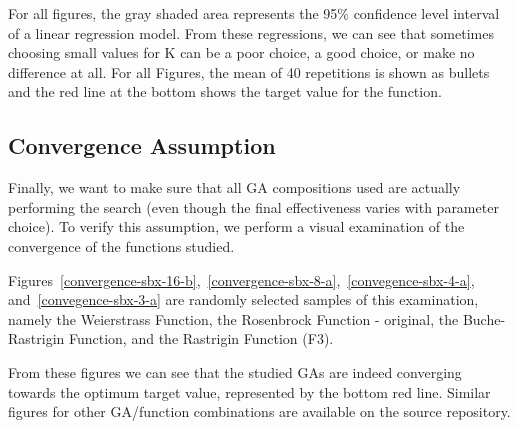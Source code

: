 For all figures, the gray shaded area represents the 95\% confidence
level interval of a linear regression model. From these regressions,
we can see that sometimes choosing small values for K can be a poor
choice, a good choice, or make no difference at all. For all Figures,
the mean of 40 repetitions is shown as bullets and the red line at the
bottom shows the target value for the function.


\subsection{Convergence Assumption}

Finally, we want to make sure that all GA compositions used are actually
performing the search (even though the final effectiveness varies with
parameter choice). To verify this assumption, we perform a
visual examination of the convergence of the functions studied. 

Figures~\ref{convergence-sbx-16-b},~\ref{convergence-sbx-8-a},~\ref{convegence-sbx-4-a},
and~\ref{convegence-sbx-3-a} are randomly selected samples of this
examination, namely the Weierstrass Function, the Rosenbrock Function
- original, the Buche-Rastrigin Function, and the Rastrigin Function
(F3).

From these figures we can see that the studied GAs are indeed
converging towards the optimum target value, represented by the bottom
red line. Similar figures for other GA/function combinations are
available on the source repository.

